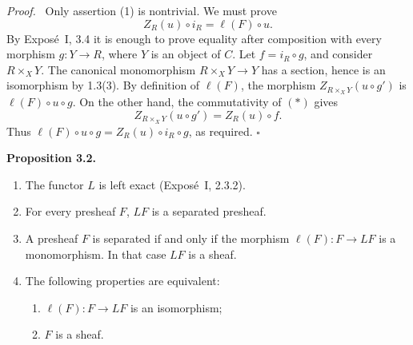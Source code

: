 \documentclass[11pt]{article}
\newcommand{\qedtext}{\hfill\(\square\)}
\newenvironment{statement}[1]{\par\medskip\noindent\textbf{#1.}\ }{\par\medskip}
\newenvironment{prooftext}{\par\noindent\emph{Proof.}\ }{\par\medskip}
\begin{document}
\begin{prooftext}
Only assertion (1) is nontrivial. We must prove
\[
Z_R(u)\circ i_R=\ell(F)\circ u.
\]
By Expos\'e~I, 3.4 it is enough to prove equality after composition with every morphism \(g:Y\to R\), where \(Y\) is an object of \(C\). Let \(f=i_R\circ g\), and consider \(R\times_XY\). The canonical monomorphism \(R\times_XY\to Y\) has a section, hence is an isomorphism by 1.3(3). By definition of \(\ell(F)\), the morphism \(Z_{R\times_XY}(u\circ g')\) is \(\ell(F)\circ u\circ g\). On the other hand, the commutativity of \((*)\) gives
\[
Z_{R\times_XY}(u\circ g')=Z_R(u)\circ f.
\]
Thus \(\ell(F)\circ u\circ g=Z_R(u)\circ i_R\circ g\), as required. \qedtext
\end{prooftext}

\begin{statement}{Proposition 3.2}
\begin{enumerate}[label=\arabic*)]
\item The functor \(L\) is left exact (Expos\'e~I, 2.3.2).
\item For every presheaf \(F\), \(LF\) is a separated presheaf.
\item A presheaf \(F\) is separated if and only if the morphism \(\ell(F):F\to LF\) is a monomorphism. In that case \(LF\) is a sheaf.
\item The following properties are equivalent:
\begin{enumerate}[label=(\roman*)]
\item \(\ell(F):F\to LF\) is an isomorphism;
\item \(F\) is a sheaf.
\end{enumerate}
\end{enumerate}
\end{statement}
\end{document}
